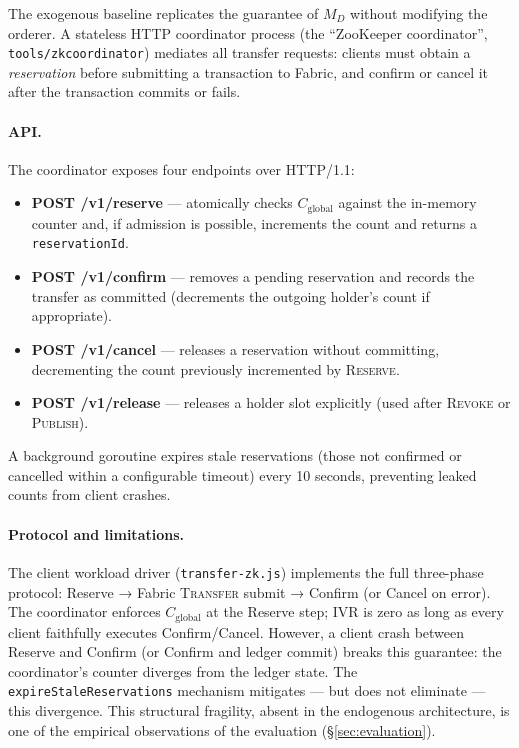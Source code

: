 The exogenous baseline replicates the guarantee of $M_D$ without modifying the
orderer.  A stateless HTTP coordinator process (the ``ZooKeeper coordinator'',
\texttt{tools/zkcoordinator}) mediates all transfer requests: clients must
obtain a \emph{reservation} before submitting a transaction to Fabric, and
confirm or cancel it after the transaction commits or fails.

\paragraph{API.}
The coordinator exposes four endpoints over HTTP/1.1:
\begin{itemize}
  \item \textbf{POST /v1/reserve} — atomically checks $C_\text{global}$ against
    the in-memory counter and, if admission is possible, increments the count
    and returns a \texttt{reservationId}.
  \item \textbf{POST /v1/confirm} — removes a pending reservation and records
    the transfer as committed (decrements the outgoing holder's count if
    appropriate).
  \item \textbf{POST /v1/cancel} — releases a reservation without committing,
    decrementing the count previously incremented by \textsc{Reserve}.
  \item \textbf{POST /v1/release} — releases a holder slot explicitly
    (used after \textsc{Revoke} or \textsc{Publish}).
\end{itemize}
A background goroutine expires stale reservations (those not confirmed or
cancelled within a configurable timeout) every 10 seconds, preventing leaked
counts from client crashes.

\paragraph{Protocol and limitations.}
The client workload driver (\texttt{transfer-zk.js}) implements the full
three-phase protocol: Reserve → Fabric \textsc{Transfer} submit → Confirm
(or Cancel on error).  The coordinator enforces $C_\text{global}$ at the
Reserve step; IVR is zero as long as every client faithfully executes
Confirm/Cancel.  However, a client crash between Reserve and Confirm (or
Confirm and ledger commit) breaks this guarantee: the coordinator's counter
diverges from the ledger state.  The \texttt{expireStaleReservations}
mechanism mitigates — but does not eliminate — this divergence.  This
structural fragility, absent in the endogenous architecture, is one of
the empirical observations of the evaluation (\S\ref{sec:evaluation}).

